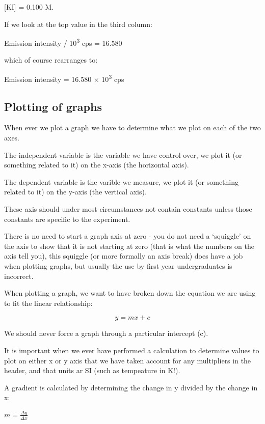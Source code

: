 \documentclass[
]{book}
\begin{document}
{[}KI{]} = 0.100 M.

If we look at the top value in the third column:

Emission intensity / 10\textsuperscript{3} cps = 16.580

which of course rearranges to:

Emission intensity = 16.580 × 10\textsuperscript{3} cps

\hypertarget{subsec:plotting}{%
\subsection{Plotting of graphs}\label{subsec:plotting}}

When ever we plot a graph we have to determine what we plot on each of the two axes.

The independent variable is the variable we have control over, we plot it (or something related to it) on the x-axis (the horizontal axis).

The dependent variable is the varible we measure, we plot it (or something related to it) on the y-axis (the vertical axis).

These axis should under most circumstances not contain constants unless those constants are specific to the experiment.

There is no need to start a graph axis at zero - you do not need a `squiggle' on the axis to show that it is not starting at zero (that is what the numbers on the axis tell you), this squiggle (or more formally an axis break) does have a job when plotting graphs, but usually the use by first year undergraduates is incorrect.

When plotting a graph, we want to have broken down the equation we are using to fit the linear relationship:

\begin{equation}
y = mx+c
\label{eq:linearplot}
\end{equation}

We should never force a graph through a particular intercept (c).

It is important when we ever have performed a calculation to determine values to plot on either x or y axis that we have taken account for any multipliers in the header, and that units ar SI (such as tempeature in K!).

A gradient is calculated by determining the change in y divided by the change in x:

\(m= \frac{\Delta y}{\Delta x}\)
\end{document}

